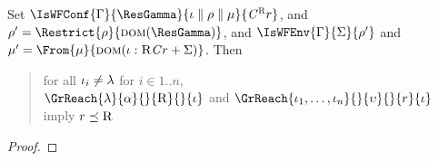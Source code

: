 \begin{proposition}
Set $\IsWFConf{\Gamma}{\ResGamma}{\Conf{\loc}{\env}{\mem}}{\Graded{\C}{\Rgr}{\rgr}}$, and $\env'=\Restrict{\env}{\dom{\ResGamma}}$, and $\IsWFEnv{\Gamma}{\Sigma}{\env'}$ and $\mem'=\From{\mem}{\dom{\CtxElem{\loc}{\Rgr}{\C}{\rgr}\ctxsum\Sigma}}$.
Then
\begin{quote}
for all $\iota_i\neq\lambda$ for $i\in 1..n$, \\
$\GrReach{\locSec}{\alpha}{}{\Rgr}{}{\loc}$ and $\GrReach{\iota_1,\ldots,\iota_n}{}{\upsilon}{}{\rgr}{\iota}$ imply $r\preceq\textsc{R}$
\end{quote}
 \end{proposition}
\begin{proof}

\end{proof}


